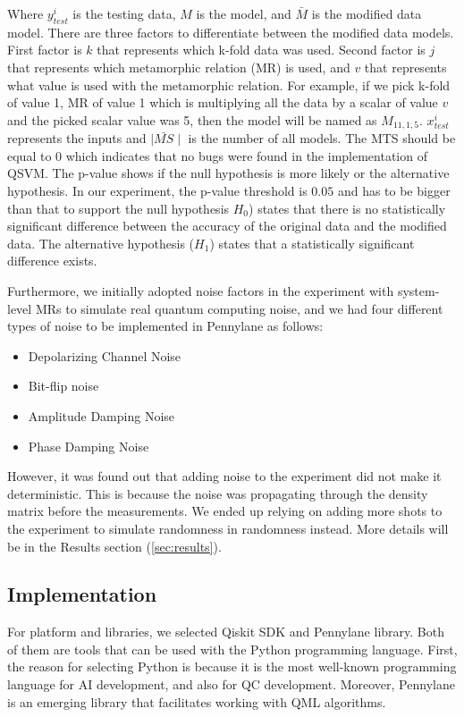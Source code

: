 \documentclass[12pt,a4paper]{article}
\begin{document}
	Where $y^i_{test}$ is the testing data, $M$ is the model, and $\bar{M}$ is the modified data model. There are three factors to differentiate between the modified data models. First factor is $k$ that represents which k-fold data was used. Second factor is $j$ that represents which metamorphic relation (MR) is used, and $v$ that represents what value is used with the metamorphic relation. For example, if we pick k-fold of value 1,  MR of value 1 which is multiplying all the data by a scalar of value $v$ and the picked scalar value was 5, then the model will be named as $M_{11,1,5}$. $x^i_{test}$ represents the inputs and $\mid \bar{MS} \mid$ is the number of all models. The MTS should be equal to 0 which indicates that no bugs were found in the implementation of QSVM. The p-value shows if the null hypothesis is more likely or the alternative hypothesis. In our experiment, the p-value threshold is $0.05$ and has to be bigger than that to support the null hypothesis $H_0$) states that there is no statistically significant difference between the accuracy of the original data and the modified data. The alternative hypothesis ($H_1$) states that a statistically significant difference exists.
	
	Furthermore, we initially adopted noise factors in the experiment with system-level MRs to simulate real quantum computing noise, and we had four different types of noise to be implemented in Pennylane as follows:
	\begin{itemize}
		\item Depolarizing Channel Noise
		\item Bit-flip noise
		\item Amplitude Damping Noise
		\item Phase Damping Noise
	\end{itemize}
	
	However, it was found out that adding noise to the experiment did not make it deterministic. This is because the noise was propagating through the density matrix before the measurements. We ended up relying on adding more shots to the experiment to simulate randomness in randomness instead. More details will be in the Results section (\ref{sec:results}).
	
	\subsection{Implementation}
	\label{sec:implementation}
	
	For platform and libraries, we selected Qiskit SDK and Pennylane library. Both of them are tools that can be used with the Python programming language. First, the reason for selecting Python is because it is the most well-known programming language for AI development, and also for QC development. Moreover, Pennylane is an emerging library that facilitates working with QML algorithms.
	
\end{document}
